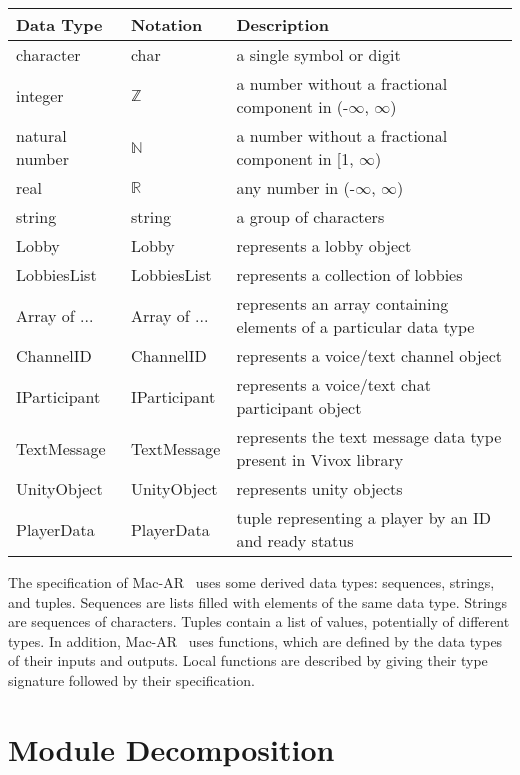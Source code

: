 \documentclass[12pt, titlepage]{article}
\begin{document}
\begin{center}
\renewcommand{\arraystretch}{1.2}
\noindent 
\begin{tabular}{l l p{7.5cm}} 
\toprule 
\textbf{Data Type} & \textbf{Notation} & \textbf{Description}\\ 
\midrule
character & char & a single symbol or digit\\
integer & $\mathbb{Z}$ & a number without a fractional component in (-$\infty$, $\infty$) \\
natural number & $\mathbb{N}$ & a number without a fractional component in [1, $\infty$) \\
real & $\mathbb{R}$ & any number in (-$\infty$, $\infty$)\\
string & string & a group of characters\\
Lobby & Lobby & represents a lobby object\\
LobbiesList & LobbiesList & represents a collection of lobbies\\
Array of ... & Array of ... & represents an array containing elements of a particular data type\\
ChannelID & ChannelID & represents a voice/text channel object\\
IParticipant & IParticipant & represents a voice/text chat participant object \\
TextMessage & TextMessage & represents the text message data type present in Vivox library\\
UnityObject & UnityObject & represents unity objects\\
PlayerData & PlayerData & tuple representing a player by an ID and ready status\\
\bottomrule
\end{tabular} 
\end{center}

\noindent
The specification of Mac-AR \ uses some derived data types: sequences, strings, and
tuples. Sequences are lists filled with elements of the same data type. Strings
are sequences of characters. Tuples contain a list of values, potentially of
different types. In addition, Mac-AR \ uses functions, which
are defined by the data types of their inputs and outputs. Local functions are
described by giving their type signature followed by their specification.

\section{Module Decomposition}
\end{document}
